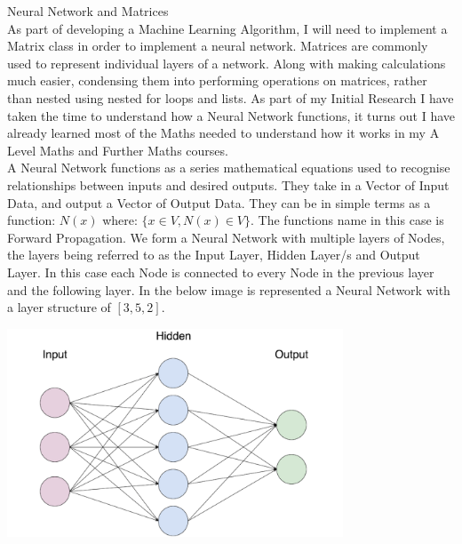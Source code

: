 \begin{flushleft}
\begin{enumerate}
\begin{enumerate}
                    {\Large Neural Network and Matrices} \\
                    As part of developing a Machine Learning Algorithm, I will need to implement a Matrix class in order to
                    implement a neural network. Matrices are commonly used to represent individual layers of a network. Along
                    with making calculations much easier, condensing them into performing operations on matrices, rather than
                    nested using nested for loops and lists. As part of my Initial Research I have taken the time to understand
                    how a Neural Network functions, it turns out I have already learned most of the Maths needed to understand
                    how it works in my A Level Maths and Further Maths courses. \\
                    \vspace{0.2cm}
                    A Neural Network functions as a series mathematical equations used to recognise relationships between inputs
                    and desired outputs. They take in a Vector of Input Data, and output a Vector of Output Data. They can be
                    in simple terms as a function: $N(x)$ where: $\{x \in V, N(x) \in V\}$. The functions name in this case is
                    Forward Propagation. 
                    \vspace{0.2cm}
                    We form a Neural Network with multiple layers of Nodes, the layers being referred to as the Input Layer, 
                    Hidden Layer/s and Output Layer. In this case each Node is connected to every Node in the previous layer and
                    the following layer. In the below image is represented a Neural Network with a layer structure of $[3, 5, 2]$.

                    \vspace{0.1cm}
                    \centerline{\includegraphics[width=10cm]{Images/Initial Research/NeuralNetworkExample.png}}


\end{enumerate}
\end{enumerate}
\end{flushleft}
